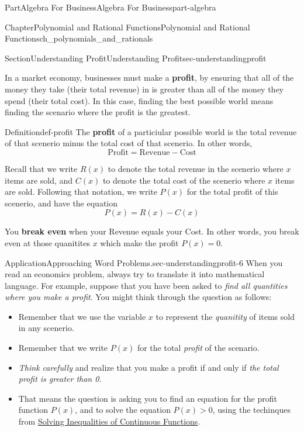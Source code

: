 \documentclass{tufte-book}
\newcommand{\terminology}[1]{\textbf{#1}}
\numberwithin{equation}{chapter}
\newcommand{\gt}{>}
\begin{document}
\begin{partptx}{Part}{Algebra For Business}{}{Algebra For Business}{}{}{part-algebra}
\begin{chapterptx}{Chapter}{Polynomial and Rational Functions}{}{Polynomial and Rational Functions}{}{}{ch_polynomials_and_rationals}
\begin{sectionptx}{Section}{Understanding Profit}{}{Understanding Profit}{}{}{sec-understandingprofit}
\par
In a market economy, businesses must make a \terminology{profit}, by ensuring that all of the money they take (their total revenue) in is greater than all of the money they spend (their total cost).  In this case, finding the best possible world means finding the scenario where the profit is the greatest.%
\begin{definition}{Definition}{}{def-profit}%
The \terminology{profit} of a particiular possible world is the total revenue of that scenerio minus the total cost of that scenerio.  In other words,%
\begin{equation*}
\text{Profit} = \text{Revenue} - \text{Cost}
\end{equation*}
%
\par
Recall that we write \(R(x)\) to denote the total revenue in the scenerio where \(x\) items are sold, and \(C(x)\) to denote the total cost of the scenerio where \(x\) items are sold.  Following that notation, we write \(P(x)\) for the total profit of this scenerio, and have the equation%
\begin{equation*}
P(x) = R(x) - C(x)
\end{equation*}
%
\par
You \terminology{break even} when your Revenue equals your Cost.  In other words, you break even at those quanitites \(x\) which make the profit \(P(x)=0\).%
\end{definition}
\begin{insight}{Application}{Approaching Word Problems.}{sec-understandingprofit-6}%
When you read an economics problem, always try to translate it into mathematical language.  For example, suppose that you have been asked to \emph{find all quantities where you make a profit}. You might think through the question as follows:%
\begin{itemize}[label=\textbullet]
\item{}Remember that we use the variable \(x\) to represent the \emph{quanitity} of items sold in any scenerio.%
\item{}Remember that we write \(P(x)\) for the total \emph{profit} of the scenario.%
\item{}\emph{Think carefully} and realize that you make a profit if and only if \emph{the total profit is greater than 0}.%
\item{}That means the question is asking you to find an equation for the profit function \(P(x)\), and to solve the equation \(P(x)\gt 0\), using the techinques from \hyperref[assemblage-continuous-inequalities]{Solving Inequalities of Continuous Functions}.%

\end{itemize}
\end{insight}
\end{sectionptx}
\end{chapterptx}
\end{partptx}
\end{document}
